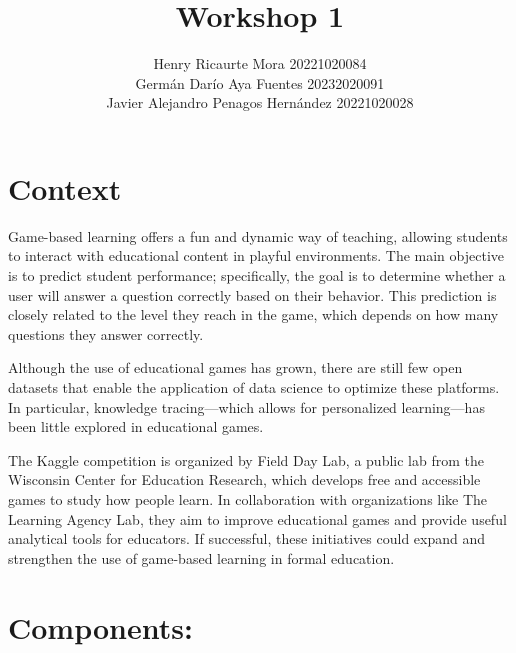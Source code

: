 \documentclass{article}
\title{Workshop 1}
\author{Henry Ricaurte Mora 20221020084 \\ Germán Darío Aya Fuentes 20232020091 \\ Javier Alejandro Penagos Hernández 20221020028}
\date{}
\begin{document}
\maketitle


\section*{Context}

Game-based learning offers a fun and dynamic way of teaching, allowing students to interact with educational content in playful environments. The main objective is to predict student performance; specifically, the goal is to determine whether a user will answer a question correctly based on their behavior. This prediction is closely related to the level they reach in the game, which depends on how many questions they answer correctly.

Although the use of educational games has grown, there are still few open datasets that enable the application of data science to optimize these platforms. In particular, knowledge tracing—which allows for personalized learning—has been little explored in educational games.

The Kaggle competition is organized by Field Day Lab, a public lab from the Wisconsin Center for Education Research, which develops free and accessible games to study how people learn. In collaboration with organizations like The Learning Agency Lab, they aim to improve educational games and provide useful analytical tools for educators. If successful, these initiatives could expand and strengthen the use of game-based learning in formal education.

\section*{Components: }
\end{document}
